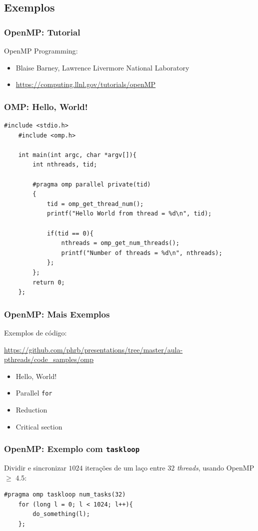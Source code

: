 \documentclass[10pt, compress, aspectratio=169, xcolor={table,usenames,dvipsnames}]{beamer}
\begin{document}
\subsection{Exemplos}

\begin{frame}
    \frametitle{OpenMP: Tutorial}
    \alert{OpenMP Programming}:
    \begin{itemize}
        \item Blaise Barney, Lawrence Livermore National Laboratory
        \item \url{https://computing.llnl.gov/tutorials/openMP}
    \end{itemize}
\end{frame}

\begin{frame}[fragile]
    \frametitle{OMP: Hello, World!}
    \begin{adjustbox}{width=.65\textwidth,center}
    \begin{lstlisting}[basicstyle=\ttfamily\scriptsize]
    #include <stdio.h>
    #include <omp.h>

    int main(int argc, char *argv[]){
        int nthreads, tid;

        #pragma omp parallel private(tid)
        {
            tid = omp_get_thread_num();
            printf("Hello World from thread = %d\n", tid);

            if(tid == 0){
                nthreads = omp_get_num_threads();
                printf("Number of threads = %d\n", nthreads);
            };
        };
        return 0;
    };
    \end{lstlisting}
    \end{adjustbox}
\end{frame}

\begin{frame}
    \frametitle{OpenMP: Mais Exemplos}
    Exemplos de código:

    {\scriptsize\url{https://github.com/phrb/presentations/tree/master/aula-pthreads/code_samples/omp}}
    \begin{itemize}
        \item Hello, World!
        \item Parallel \texttt{for}
        \item Reduction
        \item Critical section
    \end{itemize}
\end{frame}

\begin{frame}[fragile]
    \frametitle{OpenMP: Exemplo com \texttt{taskloop}}
    \alert{Dividir e sincronizar} $1024$ iterações de um laço entre $32$
    \textit{threads}, usando \alert{OpenMP $\geq$ 4.5}:

    \begin{lstlisting}[basicstyle=\ttfamily\scriptsize]
    #pragma omp taskloop num_tasks(32)
    for (long l = 0; l < 1024; l++){
        do_something(l);
    };
    \end{lstlisting}
\end{frame}

\maketitle
\end{document}
